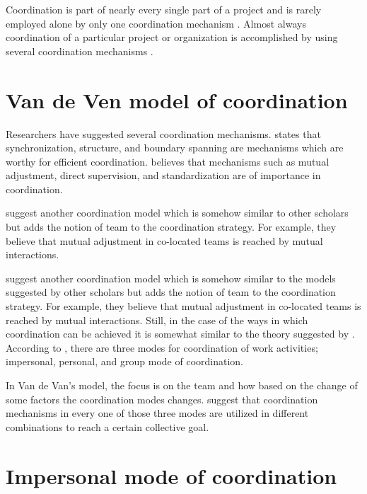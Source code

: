 Coordination is part of nearly every single part of a project and is rarely employed alone by only one coordination mechanism \citep{Osifo2012}. Almost always coordination of a particular project or organization is accomplished by using several coordination mechanisms \citep{Dietrich2013}.

\section{Van de Ven model of coordination}

Researchers have suggested several coordination mechanisms. \citet{Strode2012} states that synchronization, structure, and boundary spanning are mechanisms which are worthy for efficient coordination. \citet{Mintzberg1980} believes that mechanisms such as mutual adjustment, direct supervision, and standardization are of importance in coordination.

\citet{VanDeVen1976} suggest another coordination model which is somehow similar to other scholars but adds the notion of team to the coordination strategy. For example, they believe that mutual adjustment in co-located teams is reached by mutual interactions.

\citet{VanDeVen1976} suggest another coordination model which is somehow similar to the models suggested by other scholars but adds the notion of team to the coordination strategy. For example, they believe that mutual adjustment in co-located teams is reached by mutual interactions.
Still, in the case of the ways in which coordination can be achieved it is somewhat similar to the theory suggested by  \citet{Thompson2014}. According to \citet{VanDeVen1976}, there are three modes for coordination of work activities; impersonal, personal, and group mode of coordination.

In Van de Van's model, the focus is on the team and how based on the change of some factors the coordination modes changes. \citet{VanDeVen1976} suggest that coordination mechanisms in every one of those three modes are utilized in different combinations to reach a certain collective goal.

\section{Impersonal mode of coordination}

